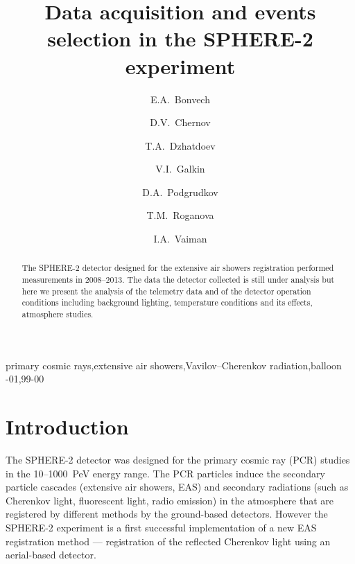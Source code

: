 \documentclass[final,5p,times,twocolumn]{elsarticle}
\begin{document}
\tableofcontents  %
\listoftodos
\linenumbers

\begin{frontmatter}
\title{Data acquisition and events selection in the SPHERE-2 experiment}

\author[address1]{E.A.~Bonvech}
\author[address1]{D.V.~Chernov}
\author[address1]{T.A.~Dzhatdoev}
\author[address2]{V.I.~Galkin}
\author[address2,address1]{D.A.~Podgrudkov}
\author[address1]{T.M.~Roganova}
\author[address2]{I.A.~Vaiman}
\address[address1]{Federal State Budget Educational Institution of Higher Education, M.V. Lomonosov Moscow State University, Skobeltsyn Institute of Nuclear Physics (SINP MSU), 1(2), Leninskie gory, GSP-1, 119991 Moscow, Russia}
\address[address2]{Federal State Budget Educational Institution of Higher Education, M.V. Lomonosov Moscow State University, Department of Physics, 1(2), Leninskie gory, GSP-1, 119991 Moscow, Russia}

\begin{abstract}
The SPHERE-2 detector designed for the extensive air showers registration performed measurements in 2008--2013. The data the detector collected is still under analysis but here we present the analysis of the telemetry data and of the detector operation conditions including background lighting, temperature conditions and its effects, atmosphere studies.
\end{abstract}

\begin{keyword}
primary cosmic rays\sep extensive air showers\sep Vavilov--Cherenkov radiation\sep balloon
-01\sep  99-00
\end{keyword}
\end{frontmatter}


\section{Introduction}
The SPHERE-2 detector was designed for the primary cosmic ray (PCR) studies in the 10--1000~PeV energy range. The PCR particles induce the secondary particle cascades (extensive air showers, EAS) and secondary radiations (such as Cherenkov light, fluorescent light, radio emission) in the atmosphere that are registered by different methods by the ground-based detectors. However the SPHERE-2 experiment is a first successful implementation of a new EAS registration method --- registration of the reflected Cherenkov light using an aerial-based detector. 
\end{document}
